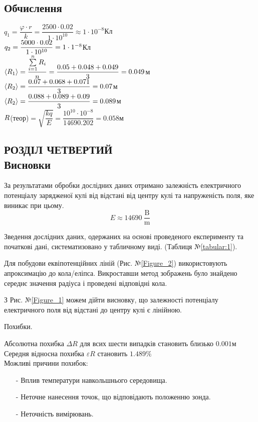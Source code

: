 \documentclass[a4paper,12pt]{article}
\begin{document}
	
	\subsection*{Обчислення}
	$q_1=\dfrac{\varphi\cdot r}{k}=\dfrac{2500\cdot0.02}{1\cdot10^{10}}\approx1\cdot10^{-8}$Кл \\
	$\\ q_2=\dfrac{5000\cdot0.02}{1\cdot10^{10}}=1\cdot1^{-8}$Кл \\
	$\\ \langle R_1\rangle=\dfrac{\sum\limits_{i=1}^{n}R_i}{n}=\dfrac{0.05+0.048+0.049}{3}=0.049$м \\
	$\\ \langle R_2\rangle=\dfrac{0.07+0.068+0.071}{3}=0.07$м \\
	$\\ \langle R_2\rangle=\dfrac{0.088+0.089+0.09}{3}=0.089$м \\
	$\\ R$(теор)$=\sqrt{\dfrac{kq}{E}}=\dfrac{10^{10}\cdot10^{-8}}{14690.202}=0.058$м
	
\newpage
	\begin{center}
		\section* {РОЗДІЛ ЧЕТВЕРТИЙ\\Висновки}
	\end{center}
	
	За результатами обробки дослідних даних отримано залежність електричного потенціалу зарядженої кулі від відстані від центру кулі та напруженість поля, яке виникає при цьому.
	$$E\approx14690\: \dfrac{\textrm{B}}{\textrm{m}}$$
	
	Зведення дослідних даних, одержаних на основі проведеного експерименту та початкові дані, систематизовано у табличному виді. (Таблиця №\ref{tabular:1}).
	
	Для побудови еквіпотенційних ліній (Рис. №\ref{Figure_2}) використовують апроксимацію до кола/еліпса.  Викроставши метод зображень було знайдено середнє значення радіуса і проведені відповідні кола. 
	
	З Рис. №\ref{Figure_1} можем дійти висновку, що залежності потенціалу електричного поля від відстані до центру кулі є лінійною. 
	
	\begin{center}
		Похибки.
	\end{center}
	Абсолютна похибка $\Delta R$ для всих шести випадків становить близько $0.001$м\\
	Середня відносна похибка $\varepsilon R$ становить  $1.489\%$ \\
	Можливі причини похибок:
	\begin{enumerate}
		\item[-] Вплив температури навкольшнього середовища.
		\item[-] Неточне нанесення точок, що відповідають положенню зонда.
		\item[-] Неточність вимірювань.
	\end{enumerate}
\end{document}
